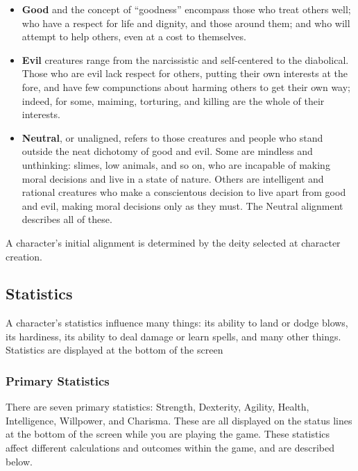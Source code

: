 \begin{itemize}
\item {\bf Good} and the concept of ``goodness'' encompass those who 
treat others well; who have a respect for life and dignity, and those
around them; and who will attempt to help others, even at a cost to
themselves.

\item {\bf Evil} creatures range from the narcissistic and self-centered 
to the diabolical.  Those who are evil lack respect for others, putting 
their own interests at the fore, and have few compunctions about harming 
others to get their own way; indeed, for some, maiming, torturing, and 
killing are the whole of their interests.

\item {\bf Neutral}, or unaligned, refers to those creatures and people
who stand outside the neat dichotomy of good and evil.  Some are mindless
and unthinking: slimes, low animals, and so on, who are incapable of making
moral decisions and live in a state of nature.  Others are intelligent
and rational creatures who make a conscientous decision to live apart from
good and evil, making moral decisions only as they must.  The Neutral
alignment describes all of these.

\end{itemize}

A character's initial alignment is determined by the deity selected at
character creation.

\subsection{Statistics}

A character's statistics influence many things: its ability to land or
dodge blows, its hardiness, its ability to deal damage or learn spells,
and many other things.  Statistics are displayed at the bottom of the
screen

\subsubsection{Primary Statistics}

There are seven primary statistics: Strength, Dexterity, Agility, Health,
Intelligence, Willpower, and Charisma.  These are all displayed on the
status lines at the bottom of the screen while you are playing the game.  
These statistics affect different calculations and outcomes within the 
game, and are described below.

